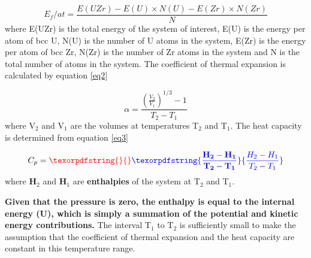 \documentclass[review]{elsarticle}
\providecommand{\DIFaddtex}[1]{{\bf #1}} %
\providecommand{\DIFdeltex}[1]{} %
\providecommand{\DIFaddbegin}{\protect\color{blue}} %
\providecommand{\DIFaddend}{\protect\color{black}} %
\providecommand{\DIFdelbegin}{\protect\color{red}} %
\providecommand{\DIFdelend}{\protect\color{black}} %
\providecommand{\DIFadd}[1]{\texorpdfstring{\DIFaddtex{#1}}{#1}} %
\providecommand{\DIFdel}[1]{\texorpdfstring{\DIFdeltex{#1}}{}} %
\newcommand{\DIFscaledelfig}{0.5}
\newlength{\DIFdelgraphicswidth} %
\newlength{\DIFdelgraphicsheight} %
\newcommand{\DIFaddincludegraphics}[2][]{{\color{blue}\fbox{\DIFOincludegraphics[#1]{#2}}}} %
\newcommand{\DIFdelincludegraphics}[2][]{%
\sbox{\DIFdelgraphicsbox}{\DIFOincludegraphics[#1]{#2}}%
\settoboxwidth{\DIFdelgraphicswidth}{\DIFdelgraphicsbox} %
\settoboxtotalheight{\DIFdelgraphicsheight}{\DIFdelgraphicsbox} %
\scalebox{\DIFscaledelfig}{%
\parbox[b]{\DIFdelgraphicswidth}{\usebox{\DIFdelgraphicsbox}\\[-\baselineskip] \rule{\DIFdelgraphicswidth}{0em}}\llap{\resizebox{\DIFdelgraphicswidth}{\DIFdelgraphicsheight}{%
\setlength{\unitlength}{\DIFdelgraphicswidth}%
\begin{picture}(1,1)%
\thicklines\linethickness{2pt} %
{\color[rgb]{1,0,0}\put(0,0){\framebox(1,1){}}}%
{\color[rgb]{1,0,0}\put(0,0){\line( 1,1){1}}}%
{\color[rgb]{1,0,0}\put(0,1){\line(1,-1){1}}}%
\end{picture}%
}\hspace*{3pt}}} %
} %
\DeclareRobustCommand{\DIFaddbegin}{\DIFOaddbegin \let\includegraphics\DIFaddincludegraphics} %
\DeclareRobustCommand{\DIFaddend}{\DIFOaddend \let\includegraphics\DIFOincludegraphics} %
\DeclareRobustCommand{\DIFdelbegin}{\DIFOdelbegin \let\includegraphics\DIFdelincludegraphics} %
\DeclareRobustCommand{\DIFdelend}{\DIFOaddend \let\includegraphics\DIFOincludegraphics} %
\begin{document}
\begin{equation}
\label{eq1}
E_{f}/at= \frac{E(UZr) - E(U)\times N(U) - E(Zr)\times N(Zr)}{N}
\end{equation} where E(UZr) is the total energy of the system of interest, E(U) is the energy per atom of bcc U, N(U) is the number of U atoms in the system, E(Zr) is the energy per atom of bcc Zr, N(Zr) is the number of Zr atoms in the system and N is the total number of atoms in the system. The coefficient of thermal expansion is calculated by equation \ref{eq2}

\begin{equation}
\label{eq2}
\alpha= \frac{(\frac{V_2}{V_1})^{1/3} - 1}{T_2-T_1}
\end{equation} where V$_2$ and V$_1$ are the volumes at temperatures T$_2$ and T$_1$. The heat capacity is determined from equation \ref{eq3}

\begin{equation}
\label{eq3}
C_p= \DIFdelbegin \DIFdel{\frac{TE_2 - TE_1}{T_2-T_1} 
}\DIFdelend \DIFaddbegin \DIFadd{\frac{H_2 - H_1}{T_2-T_1} 
}\DIFaddend \end{equation} where \DIFdelbegin \DIFdel{TE}\DIFdelend \DIFaddbegin \DIFadd{H}\DIFaddend $_2$ and \DIFdelbegin \DIFdel{TE}\DIFdelend \DIFaddbegin \DIFadd{H}\DIFaddend $_1$ are \DIFdelbegin \DIFdel{the total energies }\DIFdelend \DIFaddbegin \DIFadd{enthalpies }\DIFaddend of the system at T$_2$ and T$_1$. \DIFdelbegin %

\DIFdelend \DIFaddbegin \DIFadd{Given that the pressure is zero, the enthalpy is equal to the internal energy (U), which is simply a summation of the potential and kinetic energy contributions. }\DIFaddend The interval T$_1$ to T$_2$ is sufficiently small to make the assumption that the coefficient of thermal expansion and the heat capacity are constant in this temperature range. 
\DIFaddbegin 
\end{document}
